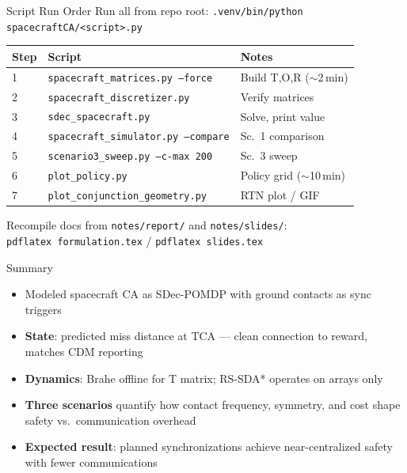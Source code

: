 \documentclass[aspectratio=169]{beamer}
\begin{document}
\begin{frame}{Script Run Order}
  \small Run all from repo root: \texttt{.venv/bin/python spacecraftCA/<script>.py}
  \vspace{0.3em}
  \begin{center}
  \begin{tabular}{lll}
    \toprule
    Step & Script & Notes \\
    \midrule
    1 & \texttt{spacecraft\_matrices.py --force} & Build T,O,R ($\sim$2\,min) \\
    2 & \texttt{spacecraft\_discretizer.py} & Verify matrices \\
    3 & \texttt{sdec\_spacecraft.py} & Solve, print value \\
    4 & \texttt{spacecraft\_simulator.py --compare} & Sc.\ 1 comparison \\
    5 & \texttt{scenario3\_sweep.py --c-max 200} & Sc.\ 3 sweep \\
    6 & \texttt{plot\_policy.py} & Policy grid ($\sim$10\,min) \\
    7 & \texttt{plot\_conjunction\_geometry.py} & RTN plot / GIF \\
    \bottomrule
  \end{tabular}
  \end{center}
  \vspace{0.3em}
  Recompile docs from \texttt{notes/report/} and \texttt{notes/slides/}:\\
  \texttt{pdflatex formulation.tex} \quad / \quad \texttt{pdflatex slides.tex}
\end{frame}

\begin{frame}{Summary}
  \begin{itemize}
    \item Modeled spacecraft CA as SDec-POMDP with ground contacts as sync triggers
    \vspace{0.5em}
    \item \textbf{State}: predicted miss distance at TCA --- clean connection to reward,
          matches CDM reporting
    \vspace{0.5em}
    \item \textbf{Dynamics}: Brahe offline for T matrix; RS-SDA* operates on arrays only
    \vspace{0.5em}
    \item \textbf{Three scenarios} quantify how contact frequency, symmetry,
          and cost shape safety vs.\ communication overhead
    \vspace{0.5em}
    \item \textbf{Expected result}: planned synchronizations achieve near-centralized
          safety with fewer communications
  \end{itemize}
\end{frame}
\end{document}
